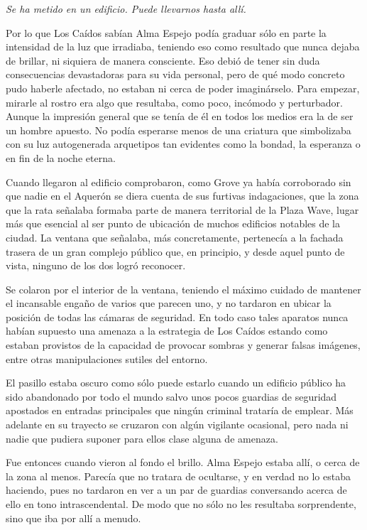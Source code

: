 \emph{Se ha metido en un edificio. Puede llevarnos hasta allí.}

Por lo que Los Caídos sabían Alma Espejo podía graduar sólo en parte la intensidad de la luz que irradiaba, teniendo eso como resultado que nunca dejaba de brillar, ni siquiera de manera consciente. Eso debió de tener sin duda consecuencias devastadoras para su vida personal, pero de qué modo concreto pudo haberle afectado, no estaban ni cerca de poder imaginárselo. Para empezar, mirarle al rostro era algo que resultaba, como poco, incómodo y perturbador. Aunque la impresión general que se tenía de él en todos los medios era la de ser un hombre apuesto. No podía esperarse menos de una criatura que simbolizaba con su luz autogenerada arquetipos tan evidentes como la bondad, la esperanza o en fin de la noche eterna.

Cuando llegaron al edificio comprobaron, como Grove ya había corroborado sin que nadie en el Aquerón se diera cuenta de sus furtivas indagaciones, que la zona que la rata señalaba formaba parte de manera territorial de la Plaza Wave, lugar más que esencial al ser punto de ubicación de muchos edificios notables de la ciudad. La ventana que señalaba, más concretamente, pertenecía a la fachada trasera de un gran complejo público que, en principio, y desde aquel punto de vista, ninguno de los dos logró reconocer.

Se colaron por el interior de la ventana, teniendo el máximo cuidado de mantener el incansable engaño de varios que parecen uno, y no tardaron en ubicar la posición de todas las cámaras de seguridad. En todo caso tales aparatos nunca habían supuesto una amenaza a la estrategia de Los Caídos estando como estaban provistos de la capacidad de provocar sombras y generar falsas imágenes, entre otras manipulaciones sutiles del entorno.

El pasillo estaba oscuro como sólo puede estarlo cuando un edificio público ha sido abandonado por todo el mundo salvo unos pocos guardias de seguridad apostados en entradas principales que ningún criminal trataría de emplear. Más adelante en su trayecto se cruzaron con algún vigilante ocasional, pero nada ni nadie que pudiera suponer para ellos clase alguna de amenaza.

Fue entonces cuando vieron al fondo el brillo. Alma Espejo estaba allí, o cerca de la zona al menos. Parecía que no tratara de ocultarse, y en verdad no lo estaba haciendo, pues no tardaron en ver a un par de guardias conversando acerca de ello en tono intrascendental. De modo que no sólo no les resultaba sorprendente, sino que iba por allí a menudo.

